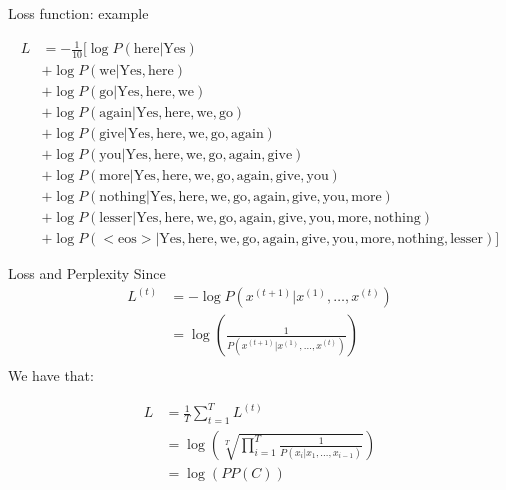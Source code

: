 \documentclass[10pt]{beamer}
\begin{document}
\begin{frame}{Loss function: example}

\begin{align*}
        L &=-\frac{1}{10}[\log P(\text{here} |\text{Yes})\\
          &+ \log P(\text{we}| \text{Yes}, \text{here})\\
          &+ \log P(\text{go}| \text{Yes}, \text{here}, \text{we})\\
          &+ \log P(\text{again}| \text{Yes}, \text{here}, \text{we}, \text{go})\\
          &+ \log P(\text{give}| \text{Yes}, \text{here}, \text{we}, \text{go}, \text{again})\\
          &+ \log P(\text{you}|\text{Yes}, \text{here}, \text{we}, \text{go}, \text{again}, \text{give})\\
          &+ \log P(\text{more}| \text{Yes}, \text{here}, \text{we}, \text{go}, \text{again}, \text{give}, \text{you})\\
          &+ \log P(\text{nothing}| \text{Yes}, \text{here}, \text{we}, \text{go}, \text{again}, \text{give}, \text{you}, \text{more})\\
          &+ \log P(\text{lesser}| \text{Yes}, \text{here}, \text{we}, \text{go}, \text{again}, \text{give}, \text{you}, \text{more}, \text{nothing})\\
          &+ \log P(<\text{eos}>| \text{Yes}, \text{here}, \text{we}, \text{go}, \text{again}, \text{give}, \text{you}, \text{more}, \text{nothing}, \text{lesser})]
\end{align*}

\end{frame}

\begin{frame}{Loss and Perplexity}
Since
\begin{align*}
L^{(t)} & = - \log P(x^{(t+1)} |x^{(1)}, \dots, x^{(t)})\\
& =  \log(\frac{1}{P(x^{(t+1)}|x^{(1)}, \dots, x^{(t)})})\\
\end{align*}
We have that:

\begin{align*}
        L &=\frac{1}{T} \sum_{t=1}^{T} L^{(t)}\\
          &= \log\left( \sqrt[T]{\prod_{i=1}^{T}\frac{1}{P(x_i \vert x_1,\dots, x_{i-1})}} \right)\\
          &= \log(PP(C))
\end{align*}
\end{frame}
\end{document}
